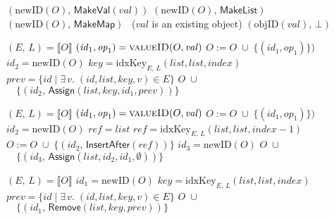 \begin{algorithm}
\begin{minipage}[t]{0.5\textwidth}
\begin{algorithmic}[0]
    \State \Return $(\mathrm{newID}(O),\, \mathsf{MakeVal}(\mathit{val}))$
    \State \Return $(\mathrm{newID}(O),\, \mathsf{MakeList})$
    \State \Return $(\mathrm{newID}(O),\, \mathsf{MakeMap})$
    \Else ~($\mathit{val}$ is an existing object)
    \State \Return $(\mathrm{objID}(\mathit{val}),\, \bot)$
    \EndIf
    \EndFunction
\end{algorithmic}
\end{minipage}%
\begin{minipage}[t]{0.5\textwidth}
\begin{algorithmic}[0]
    \State $(E,\, L) = \llbracket O \rrbracket$
    \State $(\mathit{id}_1, \mathit{op}_1) = \Call{valueID}{O, \mathit{val}}$
    \State $O := O \;\cup\; \big\{ (\mathit{id}_1, \mathit{op}_1) \big\})$
    \EndIf
    \State $\mathit{id}_2 = \mathrm{newID}(O)$
    \State $\mathit{key} = \mathrm{idxKey}_{E,\, L}(\mathit{list}, \mathit{list}, \mathit{index})$
    \State $\mathit{prev} = \{ \mathit{id} \mid \exists\,v.\; (\mathit{id}, \mathit{list}, \mathit{key}, v) \in E \}$
    \State \Return $O \;\cup$
    \State $\quad\big\{ (\mathit{id}_2,\, \mathsf{Assign}(\mathit{list}, \mathit{key}, \mathit{id}_1, \mathit{prev})) \big\}$
    \EndFunction\Statex

    \State $(E,\, L) = \llbracket O \rrbracket$
    \State $(\mathit{id}_1, \mathit{op}_1) = \Call{valueID}{O, \mathit{val}}$
    \State $O := O \;\cup\; \big\{ (\mathit{id}_1, \mathit{op}_1) \big\})$
    \EndIf
    \State $\mathit{id}_2 = \mathrm{newID}(O)$
    \State $\mathit{ref} = \mathit{list}$
    \Else
    \State $\mathit{ref} = \mathrm{idxKey}_{E,\, L}(\mathit{list}, \mathit{list}, \mathit{index} - 1)$
    \EndIf
    \State $O := O \;\cup\; \big\{ (\mathit{id}_2,\, \mathsf{InsertAfter}(\mathit{ref})) \big\}$
    \State $\mathit{id}_3 = \mathrm{newID}(O)$
    \State \Return $O \;\cup$
    \State $\quad\big\{ (\mathit{id}_3,\, \mathsf{Assign}(\mathit{list}, \mathit{id}_2, \mathit{id}_1, \emptyset)) \big\}$
    \EndFunction\Statex

    \State $(E,\, L) = \llbracket O \rrbracket$
    \State $\mathit{id}_1 = \mathrm{newID}(O)$
    \State $\mathit{key} = \mathrm{idxKey}_{E,\, L}(\mathit{list}, \mathit{list}, \mathit{index})$
    \State $\mathit{prev} = \{ \mathit{id} \mid \exists\,v.\; (\mathit{id}, \mathit{list}, \mathit{key}, v) \in E \}$
    \State \Return $O \;\cup$
    \State $\quad\big\{ (\mathit{id}_1,\, \mathsf{Remove}(\mathit{list}, \mathit{key}, \mathit{prev})) \big\}$
    \EndFunction
\end{algorithmic}
\end{minipage}
\end{algorithm}


